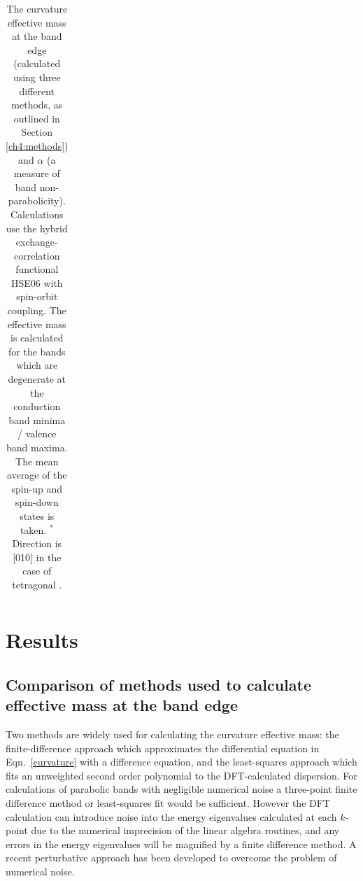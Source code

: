 \begin{landscape}
\begin{table}[tb]
\begin{tabular}{@{}lclllclllclllclll@{}}
\bottomrule
\end{tabular} 
\caption[Values for the effective mass and alpha parameter]{\label{largetable} The curvature effective mass at the band edge (calculated using three different methods, as outlined in Section \ref{ch4:methods}) and $\alpha$ (a measure of band non-parabolicity). Calculations use the hybrid exchange-correlation functional HSE06 with spin-orbit coupling. The effective mass is calculated for the bands which are degenerate at the conduction band minima / valence band maxima. The mean average of the spin-up and spin-down states is taken. $^*$Direction is [010] in the case of tetragonal . }
\end{table}
\end{landscape}

\section{Results}

\subsection{Comparison of methods used to calculate effective mass at the band edge}

Two methods are widely used for calculating the curvature effective mass:
the finite-difference approach which approximates the differential equation in Eqn.\ \ref{curvature} with a difference equation,
and the least-squares approach which fits an unweighted second order polynomial to the DFT-calculated dispersion. 
For calculations of parabolic bands with negligible numerical noise a three-point finite difference method or least-squares fit would be sufficient. 
However the DFT calculation can introduce noise into the energy eigenvalues calculated at each $k$-point due to the numerical imprecision of the linear algebra routines,
and any errors in the energy eigenvalues will be magnified by a finite difference method.\autocite{Nearing2010} 
A recent perturbative approach has been developed to overcome the problem of numerical noise.\autocite{Laflamme2016} 

